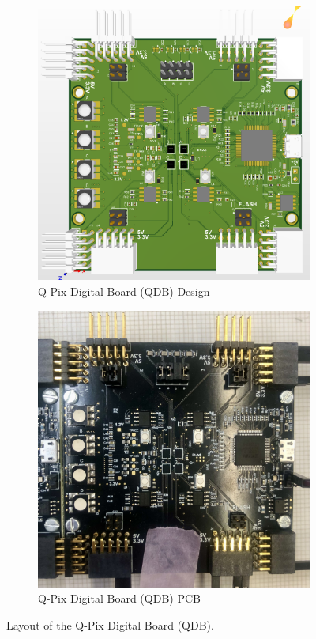 \begin{figure}
\centering
\begin{subfigure}{.5\textwidth}
  \centering
  \includegraphics[width=\textwidth]{images/qdb_layout_altium.png}
  \caption{Q-Pix Digital Board (QDB) Design}
\end{subfigure}%
\begin{subfigure}{.5\textwidth}
  \centering
  \includegraphics[width=\textwidth]{images/qdb_closeup.jpg}
  \caption{Q-Pix Digital Board (QDB) PCB}
\end{subfigure}
\caption{Layout of the Q-Pix Digital Board (QDB).}
\label{fig:qdb_diagram}
\end{figure}

